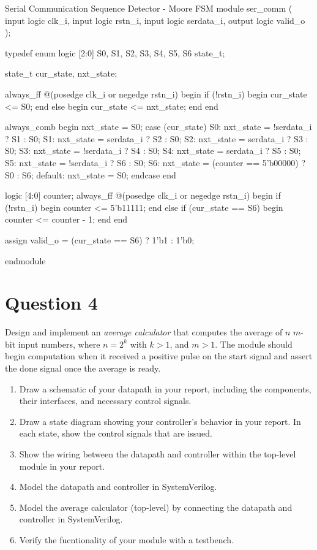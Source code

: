 \documentclass[../main.tex]{subfiles}
\begin{document}
\begin{svminted}{Serial Communication Sequence Detector - Moore FSM}
module ser_comm (
    input   logic clk_i,
    input   logic rstn_i,
    input   logic serdata_i,
    output  logic valid_o
  );

  typedef enum logic [2:0] {S0, S1, S2, S3, S4, S5, S6} state_t;

  state_t cur_state, nxt_state;

  always_ff @(posedge clk_i or negedge rstn_i) begin
    if (!rstn_i) begin
      cur_state <= S0;
    end else begin
      cur_state <= nxt_state;
    end
  end

  always_comb begin
    nxt_state = S0;
    case (cur_state)
      S0: nxt_state = !serdata_i ? S1 : S0;
      S1: nxt_state =  serdata_i ? S2 : S0;
      S2: nxt_state =  serdata_i ? S3 : S0;
      S3: nxt_state = !serdata_i ? S4 : S0;
      S4: nxt_state =  serdata_i ? S5 : S0;
      S5: nxt_state = !serdata_i ? S6 : S0;
      S6: nxt_state = (counter == 5'b00000) ? S0 : S6;
      default: nxt_state = S0;
    endcase
  end

  logic [4:0] counter;
  always_ff @(posedge clk_i or negedge rstn_i) begin
    if (!rstn_i) begin
      counter <= 5'b11111;
    end else if (cur_state == S6) begin
      counter <= counter - 1;
    end
  end

  assign valid_o = (cur_state == S6) ? 1'b1 : 1'b0;

endmodule
\end{svminted}

\newpage

\section{Question 4}

Design and implement an \textit{average calculator} that computes the average of $n$ $m$-bit input numbers, where $n = 2^k$ with $k > 1$, and $m > 1$. The module should begin computation when it received a positive pulse on the start signal and assert the done signal once the average is ready.

\begin{enumerate}
    \item Draw a schematic of your datapath in your report, including the components, their interfaces, and necessary control signals.
    \item Draw a state diagram showing your controller's behavior in your report. In each state, show the control signals that are issued.
    \item Show the wiring between the datapath and controller within the top-level module in your report.
    \item Model the datapath and controller in SystemVerilog.
    \item Model the average calculator (top-level) by connecting the datapath and controller in SystemVerilog.
    \item Verify the fucntionality of your module with a testbench.
\end{enumerate}
\end{document}
